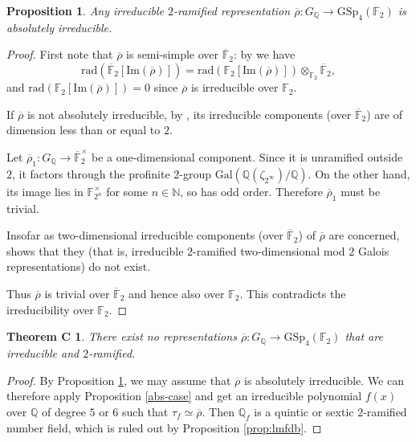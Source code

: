 \documentclass{amsart}
\newtheorem{prop}[theorem]{Proposition}
\newtheorem*{theoremC}{Theorem C}
\theoremstyle{definition}
\newtheorem{remark}[theorem]{Remark}
\newcommand{\lra}{\longrightarrow}
\newcommand{\Q}{\mathbb{Q}}
\newcommand{\N}{\mathbb{N}}
\newcommand{\F}{\mathbb{F}}
\newcommand{\bF}{\overline{\F}}
\newcommand{\rad}{\mathrm{rad}}
\newcommand{\br}{\overline{\rho}}
\newcommand{\GSp}{\mathrm{GSp}}
\newcommand{\Gal}{\mathrm{Gal}}
\newcommand{\im}{\mathrm{Im}}
\begin{document}

\begin{prop}\label{irred_to_abs}
  Any irreducible $2$-ramified representation $\br\colon G_\Q\lra\GSp_4(\F_2)$ is absolutely irreducible.
\end{prop}
\begin{proof}
  First note that $\br$ is semi-simple over $\bF_2$: by \cite[Theorem 5.17]{La} we have
  \begin{equation*}
    \rad(\bF_2[\im(\br)])=\rad(\F_2[\im(\br)])\otimes_{\F_2}\bF_2,
  \end{equation*}
  and $\rad(\F_2[\im(\br)])=0$ since $\br$ is irreducible over $\F_2$.

  If $\br$ is not absolutely irreducible, by \cite[Proposition 3.2]{TY},
  its irreducible components (over $\bF_2$) are of dimension less than or equal to $2$.

  Let $\br_1:G_\Q\lra \bF^\times_2$ be a one-dimensional component.
  Since it is unramified outside $2$, it factors through
  the profinite $2$-group $\Gal(\Q(\zeta_{2^\infty})/\Q)$.
  On the other hand, its image lies in $\F^\times_{2^n}$ for some $n\in\N$, so has odd order.
  Therefore $\br_1$ must be trivial.

  Insofar as two-dimensional irreducible components (over $\bF_2$) of $\br$ are concerned, \cite[Theorem]{Ta} shows that they (that is, irreducible $2$-ramified two-dimensional mod $2$ Galois representations) do not exist.

  Thus $\br$ is trivial over $\bF_2$ and hence also over $\F_2$.
  This contradicts the irreducibility over $\F_2$.
\end{proof}

\begin{theoremC}
  There exist no representations $\br:G_\Q\lra \GSp_4(\F_2)$ that are irreducible and $2$-ramified.
\end{theoremC}
\begin{proof}
  By Proposition \ref{irred_to_abs}, we may assume that $\br$ is absolutely irreducible.
  We can therefore apply Proposition \ref{abs-case} and get an irreducible polynomial $f(x)$ over $\Q$ of degree $5$ or $6$ such that $\tau_f\simeq\br$.
  Then $\Q_f$ is a quintic or sextic $2$-ramified number field, which is ruled out by Proposition \ref{prop:lmfdb}.
\end{proof}
\end{document}
